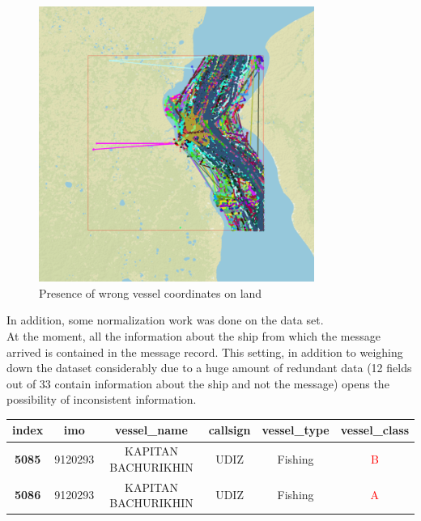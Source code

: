 \begin{itemize}
\begin{minipage}{\linewidth}
\begin{lstlisting}[language=Python]
        \end{lstlisting}
        
        \begin{figure}[H]
            \centering
            \includegraphics[width=9cm]{Images/land-points.png}
            \caption{Presence of wrong vessel coordinates on land}
        \end{figure}
        
        \end{minipage}
        
    \end{itemize}

        
    In addition, some normalization work was done on the data set.
    \\
    At the moment, all the information about the ship from which the message arrived is contained in the message record. This setting, in addition to weighing down the dataset considerably due to a huge amount of redundant data (12 fields out of 33 contain information about the ship and not the message) opens the possibility of inconsistent information.
    \\
    
    \begin{tabular}{|c|c|c|c|c|c|}
        \hline
            \textbf{index} & \textbf{imo} & \textbf{vessel\_name} & \textbf{callsign} & \textbf{vessel\_type} & \textbf{vessel\_class} \\
        \hline
            \textbf{5085} & 9120293      & KAPITAN BACHURIKHIN   & UDIZ              & Fishing               & \textcolor{red}{B}      \\
            \textbf{5086} & 9120293      & KAPITAN BACHURIKHIN   & UDIZ              & Fishing               & \textcolor{red}{A}      \\
        \hline
    \end{tabular}
    \\
    
